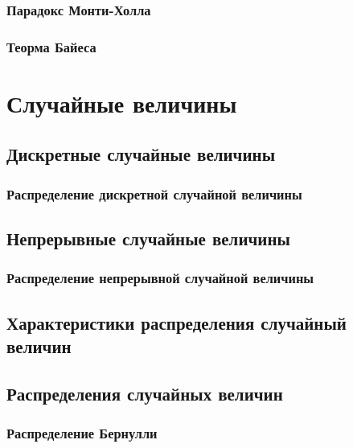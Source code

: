 \documentclass[
  letterpaper,
  DIV=11,
  numbers=noendperiod]{scrreprt}
\theoremstyle{definition}
\theoremstyle{remark}
\begin{document}
\subsection{Парадокс Монти-Холла}\label{stats-rand-exp-prob-monty}

\subsection{Теорма Байеса}\label{stats-rand-exp-bayes}


\chapter{Случайные величины}\label{stats-rand-values}

\section{Дискретные случайные
величины}\label{stats-rand-values-discrete}

\subsection{Распределение дискретной случайной
величины}\label{stats-rand-values-discrete-distribution}

\section{Непрерывные случайные
величины}\label{stats-rand-values-continuous}

\subsection{Распределение непрерывной случайной
величины}\label{stats-rand-values-continuous-distribution}

\section{Характеристики распределения случайный
величин}\label{stats-rand-values-moments}

\section{Распределения случайных
величин}\label{stats-rand-values-distributions}

\subsection{Распределение Бернулли}\label{stats-rand-values-bernoulli}
\end{document}
